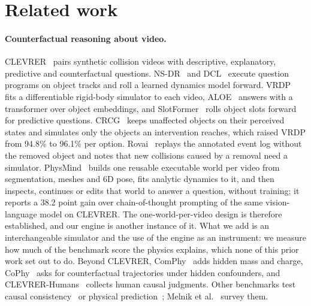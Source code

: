 \documentclass[10pt,twocolumn,letterpaper]{article}
\providecommand{\etal}{et al.}
\begin{document}
\section{Related work}
\label{sec:related}

\paragraph{Counterfactual reasoning about video.}
CLEVRER~\cite{yi2020clevrer} pairs synthetic collision videos with descriptive, explanatory, predictive and counterfactual questions.
NS-DR~\cite{yi2020clevrer} and DCL~\cite{chen2021dcl} execute question programs on object tracks and roll a learned dynamics model forward.
VRDP~\cite{ding2021vrdp} fits a differentiable rigid-body simulator to each video, ALOE~\cite{ding2021aloe} answers with a transformer over object embeddings, and SlotFormer~\cite{wu2023slotformer} rolls object slots forward for predictive questions.
CRCG~\cite{ishay2024crcg} keeps unaffected objects on their perceived states and simulates only the objects an intervention reaches, which raised VRDP from 94.8\% to 96.1\% per option.
Rovai~\cite{rovai2026eventgraph} replays the annotated event log without the removed object and notes that new collisions caused by a removal need a simulator.
PhysMind~\cite{yang2026physmind} builds one reusable executable world per video from segmentation, meshes and 6D pose, fits analytic dynamics to it, and then inspects, continues or edits that world to answer a question, without training; it reports a 38.2 point gain over chain-of-thought prompting of the same vision-language model on CLEVRER.
The one-world-per-video design is therefore established, and our engine is another instance of it.
What we add is an interchangeable simulator and the use of the engine as an instrument: we measure how much of the benchmark score the physics explains, which none of this prior work set out to do.
Beyond CLEVRER, ComPhy~\cite{chen2022comphy} adds hidden mass and charge, CoPhy~\cite{baradel2020cophy,janny2022filtered} asks for counterfactual trajectories under hidden confounders, and CLEVRER-Humans~\cite{mao2022clevrerhumans} collects human causal judgments.
Other benchmarks test causal consistency~\cite{ates2022craft,foss2025causalvqa,begiristain2026cronos} or physical prediction~\cite{bear2021physion,tung2023physionpp,bordes2025intphys2}; Melnik \etal~\cite{melnik2023benchmarks} survey them.
\end{document}
